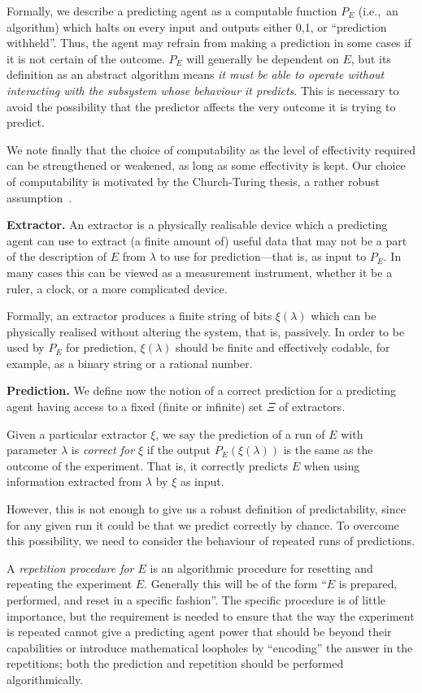 \documentclass[information,article,submit,moreauthors,pdftex,12pt,a4paper]{mdpi}
\theoremstyle{mdpi}
\newcounter{thm}
\newcounter{ex}
\newcounter{re}
\theoremstyle{mdpidefinition}
\begin{document}
Formally, we describe a predicting agent as a computable function $P_E$ (i.e.,\ an algorithm) which halts on every input and outputs either 0,1, or ``prediction withheld''.
Thus, the agent may refrain from making a prediction in some cases if it is not certain of the outcome.
$P_E$ will generally be dependent on $E$, but its definition as an abstract algorithm means \emph{it must be able to operate without interacting  with the subsystem whose behaviour it predicts}.
This is necessary to avoid the possibility that the predictor affects the very outcome it is trying to predict.

We note finally that the choice of computability as the level of effectivity required can be strengthened or weakened, as long as some effectivity is kept. Our choice of computability is motivated by the Church-Turing thesis, a rather robust assumption~\cite{sep-church-turing}.


\textbf{Extractor.}
An extractor is a physically realisable device which a predicting agent can use to extract (a finite amount of) useful data that may not be a part of the description of $E$ from $\lambda$ to use for prediction---that is, as input to $P_E$.
In many cases this can be viewed as a measurement instrument, whether it be a ruler, a clock, or a more complicated device.

Formally, an extractor
produces  a finite string of bits $\xi(\lambda)$
which can be physically realised without altering the system, that is, passively.
In order to be used by $P_E$ for prediction, $\xi(\lambda)$ should be finite and effectively codable, for example, as a binary string or a rational number.


\textbf{Prediction.}
We define now the notion of a correct prediction for a predicting agent having access to a fixed (finite or infinite) set $\Xi$ of extractors.

Given a particular extractor $\xi$, we say the prediction of a run of $E$ with parameter $\lambda$ is \emph{correct for $\xi$} if the output $P_E(\xi(\lambda))$ is the same as the outcome of the experiment.
That is, it correctly predicts $E$ when using information extracted from $\lambda$ by $\xi$ as input.

However, this is not enough to give us a robust definition of predictability, since for any given run it could be that we predict correctly by chance.
To overcome this possibility, we need to consider the behaviour of repeated runs of predictions.

A \emph{repetition procedure for $E$} is an algorithmic procedure for resetting and repeating the experiment $E$.
Generally this will be of the form ``$E$ is prepared, performed, and reset in a specific fashion''.
The specific procedure is of little importance, but the requirement is needed to ensure that the way the experiment is repeated cannot give a predicting agent power that should be beyond their capabilities or introduce mathematical loopholes by ``encoding'' the answer in the repetitions;
both the prediction and repetition should be performed algorithmically.
\end{document}
